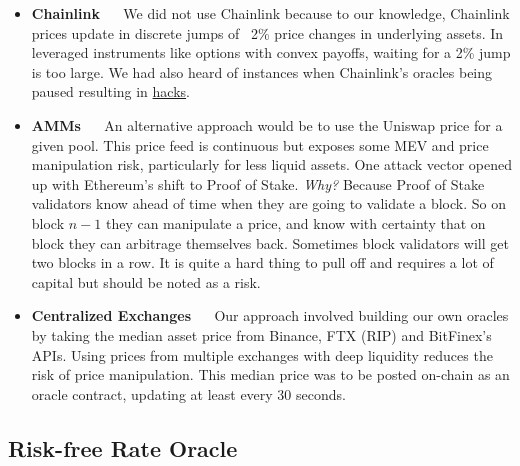 \documentclass{article}
\begin{document}
\begin{itemize}
    \item \textbf{Chainlink} $\quad$ We did not use Chainlink because to our knowledge, Chainlink prices update in discrete jumps of ~2\% price changes in underlying assets. In leveraged instruments like options with convex payoffs, waiting for a 2\% jump is too large. We had also heard of instances when Chainlink's oracles being paused resulting in \href{https://blog.venus.io/venus-protocol-official-statement-regarding-luna-6eb45c3cb058}{hacks}. 
    \item \textbf{AMMs} $\quad$  An alternative approach would be to use the Uniswap price for a given pool. This price feed is continuous but exposes some MEV and price manipulation risk, particularly for less liquid assets. One attack vector opened up with Ethereum's shift to Proof of Stake. \textit{Why?} Because Proof of Stake validators know ahead of time when they are going to validate a block. So on block $n-1$ they can manipulate a price, and know with certainty that on block they can arbitrage themselves back. Sometimes block validators will get two blocks in a row. It is quite a hard thing to pull off and requires a lot of capital but should be noted as a risk. 
    \item \textbf{Centralized Exchanges} $\quad$  Our approach involved building our own oracles by taking the median asset price from Binance, FTX (RIP) and BitFinex's APIs. Using prices from multiple exchanges with deep liquidity reduces the risk of price manipulation. This median price was to be posted on-chain as an oracle contract, updating at least every 30 seconds.
\end{itemize}

\subsection{Risk-free Rate Oracle}
\end{document}
